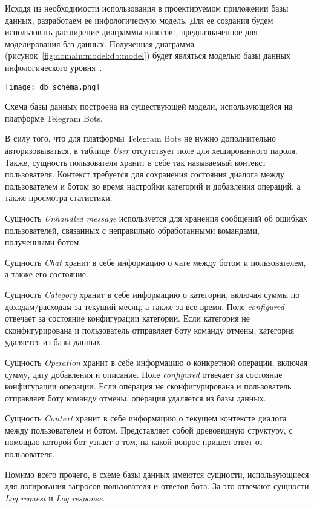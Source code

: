 Исходя из необходимости использования в проектируемом приложении базы данных, разработаем ее инфологическую модель. Для ее создания будем использовать расширение диаграммы классов \uml, предназначенное для моделирования баз данных. Полученная диаграмма (рисунок~\ref{fig:domain:model:db:model}) будет являться моделью базы данных инфологического уровня~\cite{kulikov_db_workbook}.

\begin{sidewaysfigure}
\centering
	\texttt{[image: db\_schema.png]}
	\caption{Инфологическая модель базы данных}
	\label{fig:domain:model:db:model}
\end{sidewaysfigure}

Схема базы данных построена на существующей модели, использующейся на платформе Telegram Bots.

В силу того, что для платформы Telegram Bots не нужно дополнительно авторизовываться, в таблице \emph{User} отсутствует поле для хешированного пароля. Также, сущность пользователя хранит в себе так называемый контекст пользователя. Контекст требуется для сохранения состояния диалога между пользователем и ботом во время настройки категорий и добавления операций, а также просмотра статистики.

Сущность \emph{Unhandled message} используется для хранения сообщений об ошибках пользователей, связанных с неправильно обработанными командами, полученными ботом.

Сущность \emph{Chat} хранит в себе информацию о чате между ботом и пользователем, а также его состояние.

Сущность \emph{Category} хранит в себе информацию о категории, включая суммы по доходам/расходам за текущий месяц, а также за все время. Поле \emph{configured} отвечает за состояние конфигурации категории. Если категория не сконфигурирована и пользователь отправляет боту команду отмены, категория удаляется из базы данных.

Сущность \emph{Operation} хранит в себе информацию о конкретной операции, включая сумму, дату добавления и описание. Поле \emph{configured} отвечает за состояние конфигурации операции. Если операция не сконфигурирована и пользователь отправляет боту команду отмены, операция удаляется из базы данных.

Сущность \emph{Context} хранит в себе информацию о текущем контексте диалога между пользователем и ботом. Представляет собой древовидную структуру, с помощью которой бот узнает о том, на какой вопрос пришел ответ от пользователя.

Помимо всего прочего, в схеме базы данных имеются сущности, использующиеся для логирования запросов пользователя и ответов бота. За это отвечают сущности \emph{Log request} и \emph{Log response}.